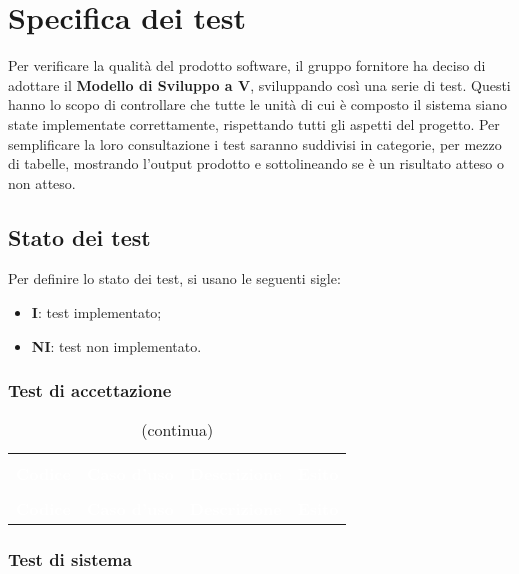 \section{Specifica dei test}
Per verificare la qualità del prodotto software, il gruppo fornitore ha deciso di adottare il \textbf{Modello di Sviluppo a V}\glo, sviluppando così una serie di test. Questi hanno lo scopo di controllare che tutte le unità di cui è composto il sistema siano state implementate correttamente, rispettando tutti gli aspetti del progetto.
Per semplificare la loro consultazione i test saranno suddivisi in categorie, per mezzo di tabelle, mostrando l'output prodotto e sottolineando se è un risultato atteso o non atteso.
\subsection{Stato dei test}
Per definire lo stato dei test, si usano le seguenti sigle:
\begin{itemize}
\item \textbf{I}: test implementato;
\item \textbf{NI}: test non implementato.
\end{itemize}


\subsubsection{Test di accettazione}

\begin{longtable}{C{2.5cm} C{2.5cm} L{8cm} C{2cm}}
\caption{Tabella dei test di accettazione} \\
\textcolor{white}{\textbf{Codice}} &
\textcolor{white}{\textbf{Caso d'uso}} &
\textcolor{white}{\textbf{Descrizione}} &
\textcolor{white}{\textbf{Esito}} \\
		\endfirsthead
		\caption[]{(continua)} \\
\textcolor{white}{\textbf{Codice}} &
\textcolor{white}{\textbf{Caso d'uso}} &
\textcolor{white}{\textbf{Descrizione}} &
\textcolor{white}{\textbf{Esito}} \\
		\endhead


\end{longtable}

\subsubsection{Test di sistema}

